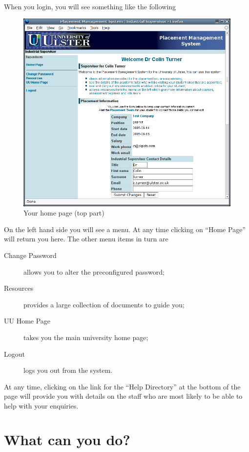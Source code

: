 When you login, you will see something like the following
\begin{figure}[htb]
\begin{center}
\includegraphics[scale=0.25]{png/supervisor_guide1.png}
\end{center}
\caption{Your home page (top part)}
\end{figure}
On the left hand side you will see a menu. 
At any time clicking on ``Home Page'' will return you here. The other menu
items in turn are

\begin{description}
\item[Change Password] allows you to alter the preconfigured password;
\item[Resources] provides a large collection of documents to guide you;
\item[UU Home Page] takes you the main university home page;
\item[Logout] logs you out from the system.
\end{description}

At any time, clicking on the link for the ``Help Directory'' at the bottom of the page
will provide you with details on the staff who are most likely to be
able to help with your enquiries.

\section{What can you do?}


